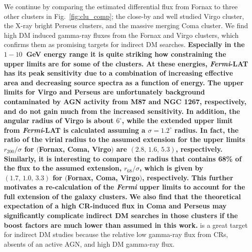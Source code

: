 \documentclass[10pt,aps,pra,reprint,amsmath,amsfonts,amssymb,showpacs,nofootinbib,floatfix]{revtex4-1}
\def\del#1{{}}
\def\C#1{{\bf #1}}
\newcommand{\Fermi}{{\em Fermi}\xspace}
\newcommand{\rvir}{r_{200}}
\begin{document}
We continue by comparing the estimated differential flux from Fornax
to three other clusters in Fig.~\ref{fig:clu_comp}; the close-by and
well studied Virgo cluster, the X-ray bright Perseus clusters, and the
massive merging Coma cluster. We find high DM induced gamma-ray fluxes
from the Fornax and Virgo clusters, which confirms them as promising
targets for indirect DM searches. \C{Especially in the $1-10$~GeV
  energy range it is quite striking how constraining the upper limits
  are for some of the clusters. At these energies, \Fermi-LAT has its
  peak sensitivity due to a combination of increasing effective area
  and decreasing source spectra as a function of energy. The upper
  limits for Virgo and Perseus are unfortunately background
  contaminated by AGN activity from M87 and NGC 1267, respectively,
  and do not gain much from the increased sensitivity. In addition,
  the angular radius of Virgo is about $6^\circ$, while the extended
  upper limit from \Fermi-LAT is calculated assuming a
  $\sigma=1.2^\circ$ radius. In fact, the ratio of the virial radius
  to the assumed extension for the upper limits $\rvir/\sigma$ for
  $($Fornax, Coma, Virgo$)$ are $(2.8,\,1.6,\,5.3)$,
  respectively. Similarly, it is interesting to compare the radius
  that contains 68\% of the flux to the assumed extension,
  $r_{68}/\sigma$, which is given by $(1.7,\,1.0,\,3.3)$ for
  $($Fornax, Coma, Virgo$)$, respectively. This further motivates a
  re-calculation of the \Fermi upper limits to account for the full
  extension of the galaxy clusters.}  \del{Note, however, that we have
  used spatially unresolved upper limits, which is quite optimistic
  for the Virgo cluster which has an angular extended of $7^\circ$. It
  is quite striking how constraining the upper limits are for the
  Fornax cluster are compared to the other clusters, especially in the
  $1-10$~GeV energy regime.}  \C{We also find that the theoretical
  expectation of a high CR-induced flux in Coma and Perseus may
  significantly complicate indirect DM searches in those clusters if
  the boost factors are much lower than assumed in this work.} \del{is
  of the same magnitude as the DM flux from LP models, making it
  difficult for indirect DM searches in those clusters.
  The Fornax cluster, however,} is a great target for indirect DM
studies because the relative low gamma-ray flux from CRs, absents of
an active AGN, and high DM gamma-ray flux. \del{The \Fermi-LAT
  three-year data will be able to constrain the smallest mass of
  substructures using the DM BM models.}
\end{document}
